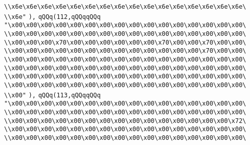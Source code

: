\verb|\\x6e\x6e\x6e\x6e\x6e\x6e\x6e\x6e\x6e\x6e\x6e\x6e\x6e\x6e\x6e\x6e\|\newline
\verb|\\x6e"|\newline
\verb|),|\newline
\verb|qQQq(112,qQQqqQQq|\newline
\verb|"\x00\x00\x00\x00\x00\x00\x00\x00\x00\x00\x00\x00\x00\x00\x00\x00\|\newline
\verb|\\x00\x00\x00\x00\x00\x00\x00\x00\x00\x00\x00\x00\x00\x00\x00\x00\|\newline
\verb|\\x00\x00\x00\x70\x00\x00\x00\x00\x00\x00\x70\x00\x00\x70\x00\x00\|\newline
\verb|\\x00\x00\x00\x00\x00\x00\x00\x00\x00\x00\x00\x00\x00\x70\x00\x00\|\newline
\verb|\\x00\x00\x00\x00\x00\x00\x00\x00\x00\x00\x00\x00\x00\x00\x00\x00\|\newline
\verb|\\x00\x00\x00\x00\x00\x00\x00\x00\x00\x00\x00\x00\x00\x00\x00\x00\|\newline
\verb|\\x00\x00\x00\x00\x00\x00\x00\x00\x00\x00\x00\x00\x00\x00\x00\x00\|\newline
\verb|\\x00\x00\x00\x00\x00\x00\x00\x00\x00\x00\x00\x00\x00\x00\x00\x00\|\newline
\verb|\\x00"|\newline
\verb|),|\newline
\verb|qQQq(113,qQQqqQQq|\newline
\verb|"\x00\x00\x00\x00\x00\x00\x00\x00\x00\x00\x00\x00\x00\x00\x00\x00\|\newline
\verb|\\x00\x00\x00\x00\x00\x00\x00\x00\x00\x00\x00\x00\x00\x00\x00\x00\|\newline
\verb|\\x00\x00\x00\x00\x00\x00\x00\x00\x00\x00\x00\x00\x00\x00\x00\x72\|\newline
\verb|\\x00\x00\x00\x00\x00\x00\x00\x00\x00\x00\x00\x00\x00\x00\x00\x00\|\newline
\verb|\\x00\x00\x00\x00\x00\x00\x00\x00\x00\x00\x00\x00\x00\x00\x00\x00\|\newline
